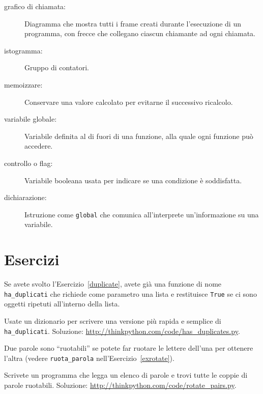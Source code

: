\documentclass[10pt]{book}
\begin{document}
\begin{description}
\item[grafico di chiamata:] Diagramma che mostra tutti i frame creati durante l'esecuzione di un programma, con frecce che collegano ciascun chiamante ad ogni chiamata.

\item[istogramma:] Gruppo di contatori.

\item[memoizzare:] Conservare una valore calcolato per evitarne il successivo ricalcolo.

\item[variabile globale:]  Variabile definita al di fuori di una funzione, alla quale ogni funzione può accedere.

\item[controllo o flag:] Variabile booleana usata per indicare se una condizione è soddisfatta.

\item[dichiarazione:] Istruzione come {\tt global} che comunica all'interprete un'informazione su una variabile.

\end{description}

\section{Esercizi}

\begin{exercise}

Se avete svolto l'Esercizio~\ref{duplicate}, avete già una funzione di nome \verb"ha_duplicati" che richiede come parametro una lista e restituisce {\tt True} se ci sono oggetti ripetuti all'interno della lista.

Usate un dizionario per scrivere una versione più rapida e semplice di
\verb"ha_duplicati". 
Soluzione: \url{http://thinkpython.com/code/has_duplicates.py}.

\end{exercise}

\vspace{0.2in}
\begin{exercise}
\label{exrotatepairs}

Due parole sono ``ruotabili'' se potete far ruotare le lettere dell'una per ottenere l'altra (vedere \verb"ruota_parola" nell'Esercizio~\ref{exrotate}).

Scrivete un programma che legga un elenco di parole e trovi tutte le coppie di parole ruotabili. Soluzione: \url{http://thinkpython.com/code/rotate_pairs.py}.

\end{exercise}
\end{document}
